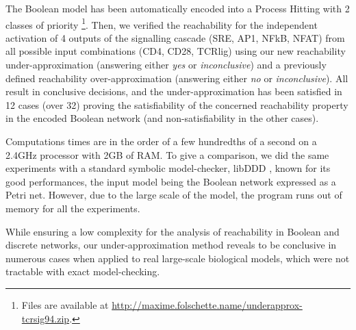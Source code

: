The Boolean model has been automatically encoded into a Process Hitting with 2 classes of priority%
\footnote{Files are available at
\url{http://maxime.folschette.name/underapprox-tcrsig94.zip}.}.
Then, we verified the reachability for the independent activation of 4 outputs of the signalling
cascade (SRE, AP1, NFkB, NFAT) from all possible input combinations (CD4, CD28, TCRlig) using our
new reachability under-approximation (answering either \emph{yes} or \emph{inconclusive}) and a 
previously defined reachability over-approximation \cite{PMR12-MSCS} (answering either \emph{no} or
\emph{inconclusive}).
All result in conclusive decisions, and the under-approximation has been satisfied in 12 cases (over
32) proving the satisfiability of the concerned reachability property in the encoded Boolean network
(and non-satisfiability in the other cases).

Computations times are in the order of a few hundredths of a second on a 2.4GHz processor with 2GB
of RAM.
To give a comparison, we did the same experiments with a standard symbolic model-checker, libDDD
\cite{libddd}, known for its good performances, the input model being the Boolean network expressed
as a Petri net.
However, due to the large scale of the model, the program runs out of memory for all the experiments.

While ensuring a low complexity for the analysis of reachability in Boolean and discrete networks, our
under-approximation method reveals to be conclusive in numerous cases when applied to real
large-scale biological models, which were not tractable with exact model-checking.

